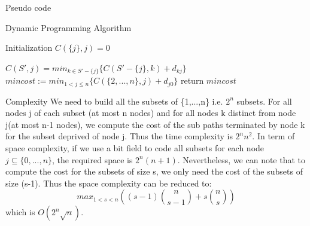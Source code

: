 \documentclass[../report.tex]{subfiles}
\begin{document}
\begin{subsection}{Pseudo code}
\begin{center}
	\colorbox[gray]{0.95}{
	\begin{minipage}{0.65\textwidth}
			\begin{algorithm}[H]
			\caption{Dynamic Programming Algorithm}
			\begin{algorithmic} 
			\STATE Initialization
			\STATE $C(\{j\},j)=0$
			\ENDFOR

					 \STATE $C(S',j)=min_{k \in S'-\{j\}}\{C(S'-\{j\},k)+d_{kj}\}$
				  \ENDFOR
			   \ENDFOR
			\ENDFOR
			\STATE $mincost := min_{1<j \leq n}\{C(\{2,...,n\},j)+d_{j0}\}$
			\STATE return $mincost$
			\end{algorithmic}
			\end{algorithm}
	 \end{minipage}}
\end{center}

\end{subsection}




\begin{subsection}{Complexity}
   We need to build all the subsets of \{1,...,n\} i.e. $2^n$ subsets. For all nodes j of each subset (at most n nodes) and for all nodes k distinct from node j(at most n-1 nodes), we compute the cost of the sub paths terminated by node k for the subset deprived of node j.
Thus the time complexity is $2^n n^2$.
\newline{} In term of space complexity, if we use a bit field to code all subsets for each node $j \subseteq \{0,...,n\}$, the required space is $2^n (n+1)$.
\newline{} Nevertheless, we can note that to compute the cost for the subsets of size s, we only need the cost of the subsets of size (s-1). Thus the space complexity can be reduced to:
$$  max_{1<s<n}((s-1) \binom{n}{s-1} + s\binom{n}{s})$$
which is $O(2^n\sqrt n)$.\cite{wikidp}
\end{subsection}
\end{document}
